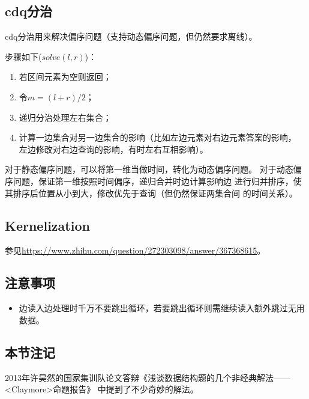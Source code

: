 \subsection{cdq分治}
cdq分治用来解决偏序问题（支持动态偏序问题，但仍然要求离线）。

步骤如下($solve(l,r)$)：
\begin{enumerate}
	\item 若区间元素为空则返回；
	\item 令$m=(l+r)/2$；
	\item 递归分治处理左右集合；
	\item 计算一边集合对另一边集合的影响（比如左边元素对右边元素答案的影响，
	左边修改对右边查询的影响，有时左右互相影响）。
\end{enumerate}

对于静态偏序问题，可以将第一维当做时间，转化为动态偏序问题。
对于动态偏序问题，保证第一维按照时间偏序，递归合并时边计算影响边
进行归并排序，使其排序后位置从小到大，修改优先于查询（但仍然保证两集合间
的时间关系）。
\subsection{Kernelization}
参见\url{https://www.zhihu.com/question/272303098/answer/367368615}。
\subsection{注意事项}
\begin{itemize}
	\item 边读入边处理时千万不要跳出循环，若要跳出循环则需继续读入额外跳过无用数据。
\end{itemize}
\subsection{本节注记}
2013年许昊然的国家集训队论文答辩《浅谈数据结构题的几个非经典解法——<Claymore>命题报告》
中提到了不少奇妙的解法。

